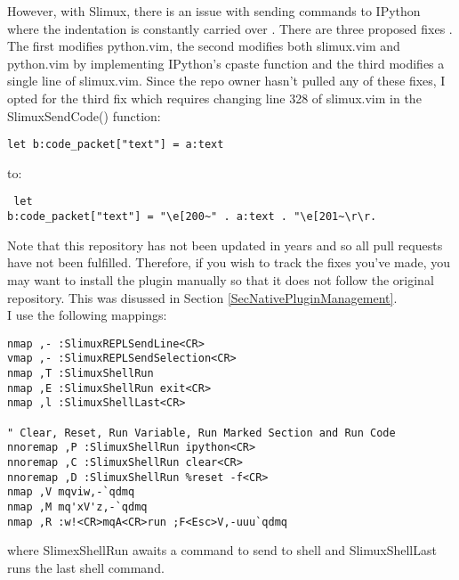 \documentclass[10pt]{article}
\begin{document}
However, with Slimux, there is an issue with sending commands to IPython where the
indentation is constantly carried over \cite{kmARC2015indentationerror}. There
are three proposed fixes
\cite{lotabout2017remove,karadaharu2016add,zcesur2018fix}. The first modifies
python.vim, the second modifies both slimux.vim and python.vim by implementing
IPython's cpaste function and the third modifies a single line of slimux.vim.
Since the repo owner hasn't pulled any of these fixes, I opted for the third fix
which requires changing line 328 of slimux.vim in the SlimuxSendCode() function:
\begin{lstlisting}
let b:code_packet["text"] = a:text
\end{lstlisting}
to:
\begin{lstlisting} let
b:code_packet["text"] = "\e[200~" . a:text . "\e[201~\r\r.
\end{lstlisting}
Note that this repository has not been updated in years and so all pull requests
have not been fulfilled. Therefore, if you wish to track the fixes you've made,
you may want to install the plugin manually so that it does not follow the
original repository. This was disussed in Section
\ref{SecNativePluginManagement}.\\

I use the following mappings:
\begin{lstlisting}
nmap ,- :SlimuxREPLSendLine<CR>
vmap ,- :SlimuxREPLSendSelection<CR>
nmap ,T :SlimuxShellRun
nmap ,E :SlimuxShellRun exit<CR>
nmap ,l :SlimuxShellLast<CR>

" Clear, Reset, Run Variable, Run Marked Section and Run Code
nnoremap ,P :SlimuxShellRun ipython<CR>
nnoremap ,C :SlimuxShellRun clear<CR>
nnoremap ,D :SlimuxShellRun %reset -f<CR>
nmap ,V mqviw,-`qdmq
nmap ,M mq'xV'z,-`qdmq
nmap ,R :w!<CR>mqA<CR>run ;F<Esc>V,-uuu`qdmq
\end{lstlisting}
where SlimexShellRun awaits a command to send to shell and SlimuxShellLast runs
the last shell command.

\end{document}
